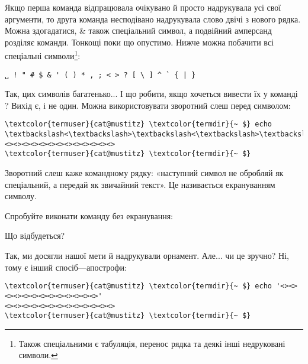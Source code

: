 Якщо перша команда відпрацювала очікувано й просто надрукувала усі свої аргументи,
то друга команда несподівано надрукувала слово  двічі з нового рядка.
Можна здогадатися, \chr\& також спеціальний символ,
а подвійний амперсанд \term{\&\&} розділяє команди.
Тонкощі поки що опустимо.
Нижче можна побачити всі спеціальні символи\footnote{
Також спеціальними є табуляція, перенос рядка та деякі інші недруковані символи.
}:

\begin{Verbatim}[fontsize=\footnotesize,commandchars=\\\{\},xleftmargin=\parindent]
␣ ! " # $ & ' ( ) * , ; < > ? [ \ ] ^ ` { | }
\end{Verbatim}

Так, цих символів багатенько...
І що робити, якщо хочеться вивести їх у команді ?
Вихід є, і не один.
Можна використовувати зворотний слеш \chr{\textbackslash} перед символом:

\begin{Verbatim}[fontsize=\footnotesize,commandchars=\\\{\},xleftmargin=\parindent]
\textcolor{termuser}{cat@mustitz} \textcolor{termdir}{~ $} echo \textbackslash<\textbackslash>\textbackslash<\textbackslash>\textbackslash<\textbackslash>\textbackslash<\textbackslash>\textbackslash<\textbackslash>\textbackslash<\textbackslash>\textbackslash<\textbackslash>\textbackslash<\textbackslash>\textbackslash<\textbackslash>\textbackslash<\textbackslash>\textbackslash<\textbackslash>\textbackslash<\textbackslash>\textbackslash<\textbackslash>
<><><><><><><><><><><><><>
\textcolor{termuser}{cat@mustitz} \textcolor{termdir}{~ $}
\end{Verbatim}

Зворотний слеш \chr{\textbackslash} каже командному рядку:
«наступний символ не обробляй як спеціальний, а передай як звичайний текст».
Це називається екрануванням символу.

\begin{exercise}
Спробуйте виконати команду без екранування:
\par{}
\par Що відбудеться?
\end{exercise}

Так, ми досягли нашої мети й надрукували орнамент.
Але... чи це зручно?
Ні, тому є інший спосіб---апострофи:

\begin{Verbatim}[fontsize=\footnotesize,commandchars=\\\{\},xleftmargin=\parindent]
\textcolor{termuser}{cat@mustitz} \textcolor{termdir}{~ $} echo '<><><><><><><><><><><><><>'
<><><><><><><><><><><><><>
\textcolor{termuser}{cat@mustitz} \textcolor{termdir}{~ $}
\end{Verbatim}

